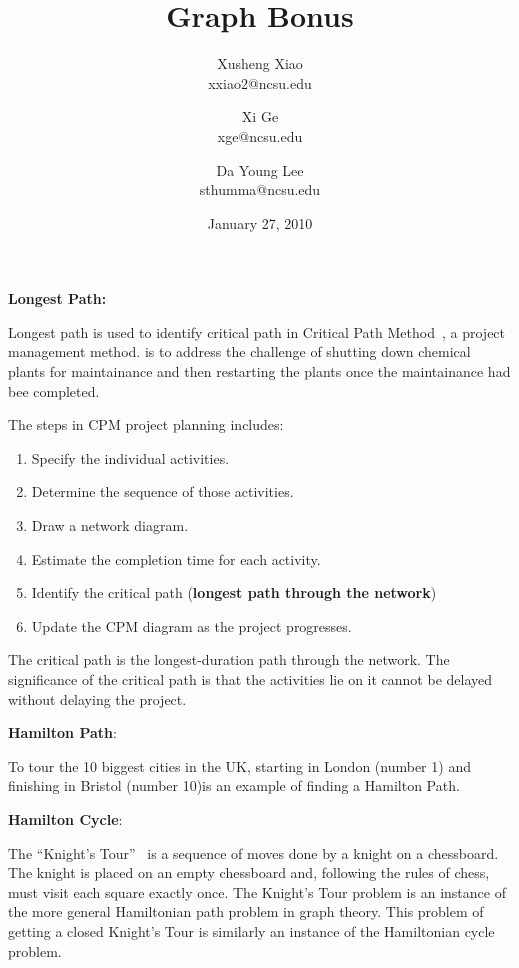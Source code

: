 \documentclass[article, 10pt,onecolumn]{article}
\title{Graph Bonus}
\author{
Xusheng Xiao\\
\small{xxiao2@ncsu.edu}\\
\and
Xi Ge\\
\small{xge@ncsu.edu}\\
\and
Da Young Lee\\
\small{sthumma@ncsu.edu}
}
\date{January 27, 2010}
\begin{document}
\maketitle

\begin{flushleft}
\textbf{Longest Path:}\end{flushleft} Longest path is used to identify critical path in Critical Path Method~\cite{cpm}, a project management method.  is to address the challenge of shutting down chemical plants for maintainance and then restarting the plants once the maintainance had bee completed. 

The steps in CPM project planning includes: 
\begin{enumerate}
	\item Specify the individual activities.
	\item Determine the sequence of those activities.
	\item Draw a network diagram.
	\item Estimate the completion time for each activity.
	\item Identify the critical path (\textbf{longest path through the network})
	\item Update the CPM diagram as the project progresses.
\end{enumerate}

The critical path is the longest-duration path through the network. The significance of the critical path is that the activities lie on it cannot be delayed without delaying the project.

\begin{flushleft}
\textbf{Hamilton Path}:\end{flushleft} To tour the 10 biggest cities in the UK, starting in London (number 1) and finishing in Bristol (number 10)is an example of finding a Hamilton Path.~\cite{path}

\begin{flushleft}
\textbf{Hamilton Cycle}:\end{flushleft} The ``Knight's Tour''~\cite{knight} is a sequence of moves done by a knight on a chessboard. The knight is placed on an empty chessboard and, following the rules of chess, must visit each square exactly once. The Knight's Tour problem is an instance of the more general Hamiltonian path problem in graph theory. This problem of getting a closed Knight's Tour is similarly an instance of the Hamiltonian cycle problem.



\end{document}
